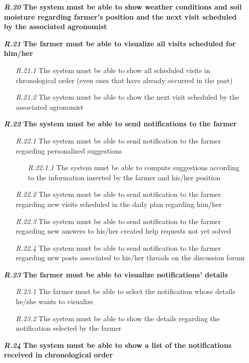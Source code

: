 \begin{itemize}
        \item [\textbf{\textit{R.20}}] \textbf{The system must be able to show weather conditions and soil moisture regarding farmer’s position and the next visit scheduled by the associated agronomist}
        \item [\textbf{\textit{R.21}}] \textbf{The farmer must be able to visualize all visits scheduled for him/her}
        \begin{itemize}
            \item [\textit{R.21.1}] The system must be able to show all scheduled visits in chronological order (even ones that have already occurred in the past)
             \item [\textit{R.21.2}] The system must be able to show the next visit scheduled by the associated agronomist
        \end{itemize}
        \item [\textbf{\textit{R.22}}] \textbf{The system must be able to send notifications to the farmer}
        \begin{itemize}
            \item [\textit{R.22.1}] The system must be able to send notification to the farmer regarding personalized suggestions
        \begin{itemize}
            \item [\textit{R.22.1.1}] The system must be able to compute suggestions according to the information inserted by the farmer and his/her position
        \end{itemize}
            \item [\textit{R.22.2}] The system must be able to send notification to the farmer regarding new visits scheduled in the daily plan regarding him/her
            \item [\textit{R.22.3}] The system must be able to send notification to the farmer regarding new answers to his/her created help requests not yet solved
            \item [\textit{R.22.4}] The system must be able to send notification to the farmer regarding new posts associated to his/her threads on the discussion forum
        \end{itemize}
        \item [\textbf{\textit{R.23}}] \textbf{The farmer must be able to visualize notifications’ details}
        \begin{itemize}
            \item [\textit{R.23.1}] The farmer must be able to select the notification whose details he/she wants to visualize
            \item [\textit{R.23.2}] The system must be able to show the details regarding the notification selected by the farmer
        \end{itemize}
        \item [\textbf{\textit{R.24}}] \textbf{The system must be able to show a list of the notifications received in chronological order}





\end{itemize}
